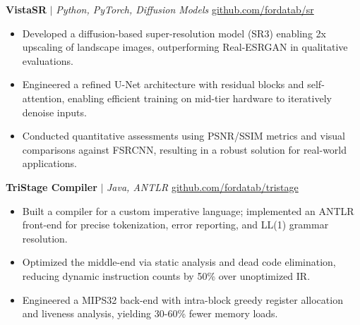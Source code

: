 \documentclass[11pt]{article}
\begin{document}
\textbf{VistaSR} $|$ \emph{Python, PyTorch, Diffusion Models} \hfill \href{https://github.com/fordatab/sr}{github.com/fordatab/sr}
\vspace{-2pt}
\begin{itemize}
    \item Developed a diffusion-based super-resolution model (SR3) enabling 2x upscaling of landscape images, outperforming Real-ESRGAN in qualitative evaluations.
    \item Engineered a refined U-Net architecture with residual blocks and self-attention, enabling efficient training on mid-tier hardware to iteratively denoise inputs.
    \item Conducted quantitative assessments using PSNR/SSIM metrics and visual comparisons against FSRCNN, resulting in a robust solution for real-world applications.
\end{itemize}
\vspace{4pt} 

\textbf{TriStage Compiler} $|$ \emph{Java, ANTLR} \hfill \href{https://github.com/fordatab/tristage}{github.com/fordatab/tristage}
\vspace{-2pt}
\begin{itemize}
    \item Built a compiler for a custom imperative language; implemented an ANTLR front-end for precise tokenization, error reporting, and LL(1) grammar resolution.
    \item Optimized the middle-end via static analysis and dead code elimination, reducing dynamic instruction counts by 50\% over unoptimized IR.
    \item Engineered a MIPS32 back-end with intra-block greedy register allocation and liveness analysis, yielding 30-60\% fewer memory loads.
\end{itemize}
\vspace{4pt} 

\end{document}
